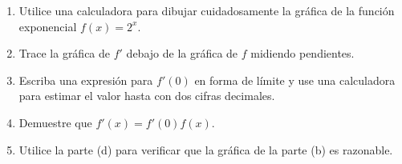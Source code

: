 \item \par
\begin{enumerate}
    \item[(a)] Utilice una calculadora para dibujar cuidadosamente la gráfica de la función exponencial $f(x) = 2^x$.
    \item[(b)] Trace la gráfica de $f'$ debajo de la gráfica de $f$ midiendo pendientes.
    \item[(c)] Escriba una expresión para $f'(0)$ en forma de límite y use una calculadora para estimar el valor hasta con dos cifras decimales.
    \item[(d)] Demuestre que $f'(x) = f'(0)f(x)$.
    \item[(e)] Utilice la parte (d) para verificar que la gráfica de la parte (b) es razonable.
\end{enumerate}
